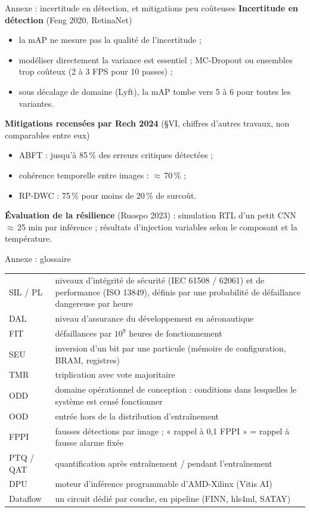 \documentclass[aspectratio=169,11pt]{beamer}
\begin{document}
\begin{frame}{Annexe : incertitude en détection, et mitigations peu coûteuses}
  \footnotesize
  \textbf{Incertitude en détection} (Feng 2020, RetinaNet)
  \begin{itemize}
    \item la mAP ne mesure pas la qualité de l'incertitude ;
    \item modéliser directement la variance est essentiel ; MC-Dropout ou ensembles trop
          coûteux (2 à 3 FPS pour 10 passes) ;
    \item sous décalage de domaine (Lyft), la mAP tombe vers 5 à 6 pour toutes les variantes.
  \end{itemize}

  \textbf{Mitigations recensées par Rech 2024} (§VI, chiffres d'autres travaux, non
  comparables entre eux)
  \begin{itemize}
    \item ABFT : jusqu'à 85\,\% des erreurs critiques détectées ;
    \item cohérence temporelle entre images : $\approx$\,70\,\% ;
    \item RP-DWC : 75\,\% pour moins de 20\,\% de surcoût.
  \end{itemize}
  \textbf{Évaluation de la résilience} (Ruospo 2023) : simulation RTL d'un petit CNN
  $\approx$\,25 min par inférence ; résultats d'injection variables selon le composant et la
  température.
\end{frame}

\begin{frame}{Annexe : glossaire}
  \footnotesize
  \begin{tabularx}{\textwidth}{@{}p{2.2cm} L@{}}
    \toprule
    SIL / PL & niveaux d'intégrité de sécurité (IEC 61508 / 62061) et de performance
      (ISO 13849), définis par une probabilité de défaillance dangereuse par heure \\
    DAL & niveau d'assurance du développement en aéronautique \\
    FIT & défaillances par $10^9$ heures de fonctionnement \\
    SEU & inversion d'un bit par une particule (mémoire de configuration, BRAM, registres) \\
    TMR & triplication avec vote majoritaire \\
    ODD & domaine opérationnel de conception : conditions dans lesquelles le système est
      censé fonctionner \\
    OOD & entrée hors de la distribution d'entraînement \\
    FPPI & fausses détections par image ; « rappel à 0,1 FPPI » = rappel à fausse alarme fixée \\
    PTQ / QAT & quantification après entraînement / pendant l'entraînement \\
    DPU & moteur d'inférence programmable d'AMD-Xilinx (Vitis AI) \\
    Dataflow & un circuit dédié par couche, en pipeline (FINN, hls4ml, SATAY) \\
    \bottomrule
  \end{tabularx}
\end{frame}
\end{document}
